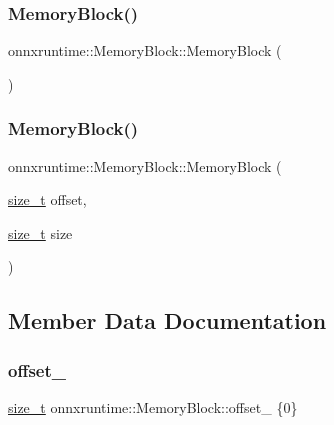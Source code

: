 \subsubsection{\texorpdfstring{Memory\+Block()}{MemoryBlock()}\hspace{0.1cm}{\footnotesize\ttfamily [1/2]}}
{\footnotesize\ttfamily onnxruntime\+::\+Memory\+Block\+::\+Memory\+Block (\begin{DoxyParamCaption}{ }\end{DoxyParamCaption})\hspace{0.3cm}{\ttfamily [default]}}

\mbox{\label{structonnxruntime_1_1MemoryBlock_ab760e81a71849d79df27bac38c2b2b5e}} 
\subsubsection{\texorpdfstring{Memory\+Block()}{MemoryBlock()}\hspace{0.1cm}{\footnotesize\ttfamily [2/2]}}
{\footnotesize\ttfamily onnxruntime\+::\+Memory\+Block\+::\+Memory\+Block (\begin{DoxyParamCaption}\item[{\mbox{\hyperlink{mlasi_8h_a503efbc1c6e50825320ad909366b78ab}{size\+\_\+t}}}]{offset,  }\item[{\mbox{\hyperlink{mlasi_8h_a503efbc1c6e50825320ad909366b78ab}{size\+\_\+t}}}]{size }\end{DoxyParamCaption})\hspace{0.3cm}{\ttfamily [inline]}}



\subsection{Member Data Documentation}
\mbox{\label{structonnxruntime_1_1MemoryBlock_a01f9644f997629495fc7fc3aa11d6a07}} 
\subsubsection{\texorpdfstring{offset\+\_\+}{offset\_}}
{\footnotesize\ttfamily \mbox{\hyperlink{mlasi_8h_a503efbc1c6e50825320ad909366b78ab}{size\+\_\+t}} onnxruntime\+::\+Memory\+Block\+::offset\+\_\+ \{0\}}

